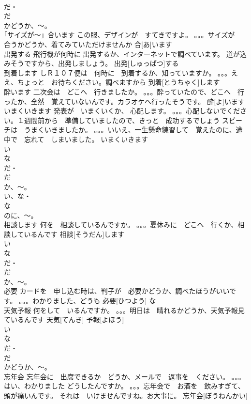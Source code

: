 \documentclass[8pt]{extreport}
\begin{document}
\begin{CJK}{UTF8}{min}
\\	だ・
\\	だ 
\\	かどうか、～。
\\	｢サイズが～」合います	この服、デザインが　すてきですよ。 。。。サイズが　合うかどうか、着てみていただけませんか	合[あ]います			
\\	出発する	飛行機が何時に 出発するか、インターネットで調べています。 道が込みそうですから、出発しましょう。	出発[しゅっぱつ]する			
\\	到着します	しＲ１０７便は　何時に　到着するか、知っていますか。 。。。ええ、ちょっと　お待ちください。調べますから	到着[とうちゃく]します					
\\	酔います	二次会は　どこへ　行きましたか。 。。。酔っていたので、どこへ　行ったか、全然　覚えていないんです。カラオケへ行ったそうです。	酔[よ]います			
\\	いまくいきます	発表が　いまくいくか、 心配します。 。。。心配しないでください。１週間前から　準備していましたので、きっと　成功するでしょう スピーチは　うまくいきましたか。 。。。いいえ、一生懸命練習して　覚えたのに、途中で　忘れて　しまいました。	いまくいきます			
\\	い　
\\	な
\\	だ・
\\	だ 
\\	か、～。
\\	い、な・
\\	な
\\	のに、～。
\\	相談します	何を　相談しているんですか。 。。。夏休みに　どこへ　行くか、相談しているんです	相談[そうだん]します			
\\	い　
\\	な
\\	だ・
\\	だ 
\\	か、～。
\\	必要	カードを　申し込む時は、判子が　必要かどうか、調べたほうがいいです。 。。。わかりました、どうも	必要[ひつよう]				な	
\\	天気予報	何をして　いるんですか。 。。。明日は　晴れるかどうか、天気予報見ているんです	天気[てんき] 予報[よほう]			
\\	い　
\\	な
\\	だ・
\\	だ 
\\	かどうか、～。
\\	忘年会	忘年会に　出席できるか　どうか、メールで　返事を　ください。 。。。はい、わかりました どうしたんですか。 。。。忘年会で　お酒を　飲みすぎて、頭が痛いんです。 それは　いけませんですね。お大事に。	忘年会[ぼうねんかい]			

\end{CJK}
\end{document}
